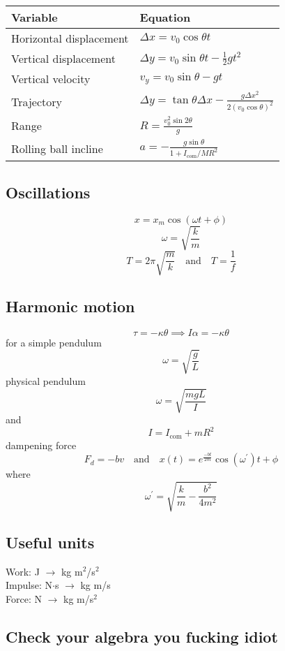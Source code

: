 \documentclass{article}
\begin{document}
\begin{multicols}{2}
\begin{tabular}{|l|l|}
	\hline
	Variable & Equation \\
	\hline
	Horizontal displacement & $\Delta x = v_0 \cos \theta t$ \\
	Vertical displacement & $\Delta y = v_0 \sin \theta t - \frac{1}{2}gt^2$ \\
	Vertical velocity & $v_y = v_0 \sin \theta - gt$ \\
	Trajectory & $\Delta y = \tan \theta \Delta x - \frac{g \Delta x^2}{2(v_0\cos \theta)^2}$ \\
	Range & $R = \frac{v_0^2 \sin 2\theta}{g}$ \\
	Rolling ball incline & $a = -\frac{g \sin \theta}{1 + I_\text{com} / MR^2}$ \\
	\hline
\end{tabular}

\subsection*{Oscillations}
\[
	x = x_m \cos(\omega t + \phi)
\]
\[
	\omega = \sqrt{\frac{k}{m}}
\]
\[
	T = 2 \pi \sqrt{\frac{m}{k}} \quad \text{and} \quad T = \frac{1}{f}
\]

\subsection*{Harmonic motion}
\[
	\tau = - \kappa \theta \implies I \alpha = - \kappa \theta
\]
for a simple pendulum
\[
	\omega = \sqrt{\frac{g}{L}}
\]
physical pendulum
\[
	\omega = \sqrt{\frac{mgL}{I}}
\]
and
\[
	I = I_\text{com} + mR^2
\]
dampening force
\[
	F_d = -bv \quad \text{and} \quad x(t) = e^\frac{-bt}{2m} \cos (\omega^\prime)t + \phi
\]
where
\[
	\omega^\prime = \sqrt{\frac{k}{m}-\frac{b^2}{4m^2}}
\]

\subsection*{Useful units}
Work: J $\rightarrow$ kg m$^2$/s$^2$ \\
Impulse: N$\cdot$s $\rightarrow$ kg m/s \\
Force: N $\rightarrow$ kg m/s$^2$


\subsection*{Check your algebra you fucking idiot}

\end{multicols}
\end{document}

